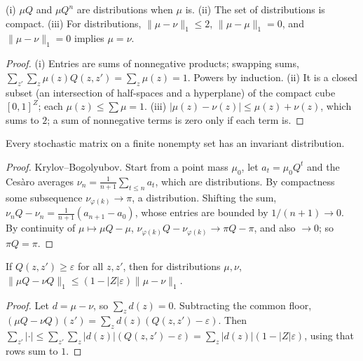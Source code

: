\begin{lemma}[Distributions]
\label{lem:distributions}
\leanok
{}
(i) $\mu Q$ and $\mu Q^n$ are distributions when $\mu$ is. (ii) The set of distributions is compact. (iii) For
distributions, $\|\mu - \nu\|_1 \le 2$, $\|\mu - \mu\|_1 = 0$, and $\|\mu - \nu\|_1 = 0$ implies $\mu = \nu$.
\end{lemma}
\begin{proof}
\leanok
(i) Entries are sums of nonnegative products; swapping sums, $\sum_{z'} \sum_z \mu(z) Q(z, z') = \sum_z \mu(z) = 1$.
Powers by induction. (ii) It is a closed subset (an intersection of half-spaces and a hyperplane) of the compact cube
$[0, 1]^Z$; each $\mu(z) \le \sum \mu = 1$. (iii) $|\mu(z) - \nu(z)| \le \mu(z) + \nu(z)$, which sums to $2$; a sum of
nonnegative terms is zero only if each term is.
\end{proof}

\begin{theorem}
\label{thm:exists_invariant}
\leanok
{}
Every stochastic matrix on a finite nonempty set has an invariant distribution.
\end{theorem}
\begin{proof}
\leanok
Krylov--Bogolyubov. Start from a point mass $\mu_0$, let $a_t = \mu_0 Q^t$ and the Ces\`aro averages
$\nu_n = \frac{1}{n+1}\sum_{t \le n} a_t$, which are distributions. By compactness some subsequence
$\nu_{\varphi(k)} \to \pi$, a distribution. Shifting the sum, $\nu_n Q - \nu_n = \frac{1}{n+1}(a_{n+1} - a_0)$, whose
entries are bounded by $1/(n+1) \to 0$. By continuity of $\mu \mapsto \mu Q - \mu$, $\nu_{\varphi(k)} Q - \nu_{\varphi(k)}
\to \pi Q - \pi$, and also $\to 0$; so $\pi Q = \pi$.
\end{proof}

\begin{lemma}
\label{lem:l1_contract}
\leanok
{}
If $Q(z, z') \ge \varepsilon$ for all $z, z'$, then for distributions $\mu, \nu$,
$\|\mu Q - \nu Q\|_1 \le (1 - |Z|\varepsilon)\|\mu - \nu\|_1$.
\end{lemma}
\begin{proof}
\leanok
Let $d = \mu - \nu$, so $\sum_z d(z) = 0$. Subtracting the common floor,
$(\mu Q - \nu Q)(z') = \sum_z d(z)(Q(z, z') - \varepsilon)$. Then
$\sum_{z'} |\cdot| \le \sum_{z'}\sum_z |d(z)|(Q(z, z') - \varepsilon) = \sum_z |d(z)| (1 - |Z|\varepsilon)$, using that
rows sum to $1$.
\end{proof}

